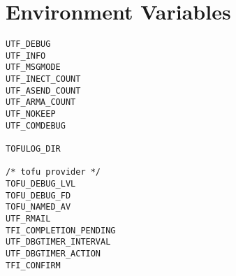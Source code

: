\section{Environment Variables}

\begin{verbatim}
UTF_DEBUG
UTF_INFO
UTF_MSGMODE
UTF_INECT_COUNT
UTF_ASEND_COUNT
UTF_ARMA_COUNT
UTF_NOKEEP
UTF_COMDEBUG

TOFULOG_DIR

/* tofu provider */
TOFU_DEBUG_LVL
TOFU_DEBUG_FD
TOFU_NAMED_AV
UTF_RMAIL
TFI_COMPLETION_PENDING
UTF_DBGTIMER_INTERVAL
UTF_DBGTIMER_ACTION
TFI_CONFIRM
\end{verbatim}
